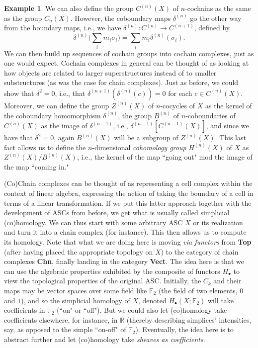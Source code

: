 \documentclass[11pt]{book}
\theoremstyle{definition}
\newtheorem{example}{Example}[section]
\theoremstyle{definition}
\theoremstyle{definition}
\theoremstyle{theorem}
\theoremstyle{definition}
\begin{document}
\begin{example}
	We can also define the group $C^{(n)}(X)$ of $n$-cochains as the same as the group $C_n(X)$. However, the coboundary maps $\delta^{(n)}$ go the other way from the boundary maps, i.e., we have $\delta^{(n)}: C^{(n)} \rightarrow C^{(n+1)}$, defined by 
	\begin{equation}
	\delta^{(n)} \Big(\sum_i m_i \sigma_i \Big) = \sum_i m_i \delta^{(n)}(\sigma_i).
	\end{equation}   
	 We can then build up sequences of cochain groups into cochain complexes, just as one would expect. Cochain complexes in general can be thought of as looking at how objects are related to larger superstructures instead of to smaller substructures (as was the case for chain complexes). Just as before, we could show that $\delta^2 = 0$, i.e., that $\delta^{(n+1)}(\delta^{(n)}(c))= 0$ for each $c \in C^{(n)}(X)$. Moreover, we can define the group $Z^{(n)}(X)$ of $n$-cocycles of $X$ as the kernel of the coboundary homomorphism $\delta^{(n)}$, the group $B^{(n)}$ of $n$-coboundaries of $C^{(n)}(X)$ as the image of $\delta^{(n-1)}$, i.e., $\delta^{(n-1)}[C^{(n-1)}(X)]$, and since we have that $\delta^2 = 0$, again $B^{(n)}(X)$ will be a subgroup of $Z^{(n)}(X)$. This last fact allows us to define the $n$-dimensional \textit{cohomology group} $H^{(n)}(X)$ of $X$ as $Z^{(n)}(X)/B^{(n)}(X)$, i.e., the kernel of the map ``going out" mod the image of the map ``coming in." \par 
	 (Co)Chain complexes can be thought of as representing a cell complex within the context of linear algebra, expressing the action of taking the boundary of a cell in terms of a linear transformation. If we put this latter approach together with the development of ASCs from before, we get what is usually called simplicial (co)homology. We can thus start with some arbitrary ASC $X$ or its realization and turn it into a chain complex (for instance). This then allows us to compute its homology. Note that what we are doing here is moving \textit{via functors} from \textbf{Top} (after having placed the appropriate topology on $X$) to the category of chain complexes \textbf{Chn}, finally landing in the category \textbf{Vect}. The idea here is that we can use the algebraic properties exhibited by the composite of functors $H_{\bullet}$ to view the topological properties of the original ASC. Initially, the $C_k$ and their maps may be vector spaces over some field like $\mathbb{F}_2$ (the field of two elements, $0$ and $1$), and so the simplicial homology of $X$, denoted $H_{\bullet}(X; \mathbb{F}_2)$ will take coefficients in $\mathbb{F}_2$ (``on" or ``off"). But we could also let (co)homology take coefficients elsewhere, for instance, in $\mathbb{R}$ (thereby describing simplices' intensities, say, as opposed to the simple ``on-off" of $\mathbb{F}_2$). Eventually, the idea here is to abstract further and let (co)homology take \textit{sheaves as coefficients}.\par  

\end{example}
\end{document}
